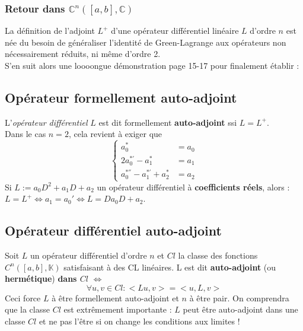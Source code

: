 \documentclass[british,french,11pt, a4paper, openany]{book}
\begin{document}
		\subsubsection{Retour dans $\mathbb{C}^n([a,b],\mathbb{C})$}
		La définition de l'adjoint $L^+$ d'une opérateur différentiel linéaire $L$ d'ordre $n$ est née du besoin de généraliser l'identité de Green-Lagrange aux opérateurs non nécessairement réduits, ni même d'ordre 2.\\
		S'en suit alors une loooongue démonstration page 15-17 pour finalement établir :\\
													
													
		\subsection{Opérateur formellement auto-adjoint}
		L'\textit{opérateur différentiel} $L$ est dit formellement \textbf{auto-adjoint} ssi $L = L^+$.\\
		Dans le cas $n=2$, cela revient à exiger que
		\begin{equation}
			\left\{\begin{array}{ll}
			a_0^* &= a_0\\
			2a_{0}^{*'}- a_1^* &= a_1\\
			a_0^{*''} - a_1^{*'} + a_2^* &= a_2
			\end{array}\right.
		\end{equation}
		Si $L:= a_0D^2 + a_1D + a_2$ un opérateur différentiel à \textbf{coefficients réels}, alors : $L = L^+ \Leftrightarrow a_1 = a_0' \Leftrightarrow L = Da_0D + a_2$.
													
		\subsection{Opérateur différentiel auto-adjoint}
		Soit $L$ un opérateur différentiel d'ordre $n$ et $Cl$ la classe des fonctions $C^n([a,b],\mathbb{K})$ satisfaisant à des CL linéaires. L est dit \textbf{auto-adjoint} (ou \textbf{hermétique}) \textbf{dans $Cl$} $\Leftrightarrow$
		\begin{equation}
			\forall u,v \in Cl : <Lu,v> = <u,L,v>
		\end{equation}
		Ceci force $L$ à être formellement auto-adjoint et $n$ à être pair.  On comprendra que la classe $Cl$ est extrêmement importante : $L$ peut être auto-adjoint dans une classe $Cl$ et ne pas l'être si on change les conditions aux limites !
													
\end{document}
